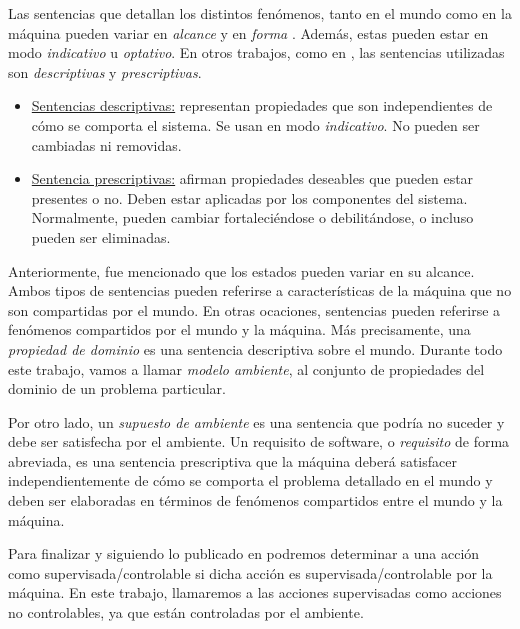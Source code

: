 Las sentencias que detallan los distintos fenómenos, tanto en el mundo como en la máquina pueden variar en
\emph{alcance} y en \emph{forma} \cite{Parnas95functionaldocuments,Jackson:1995:SRA:210207}. Además, estas pueden estar en modo \emph{indicativo} u \emph{optativo}. En
otros trabajos, como en \cite{van2009requirements}, las sentencias utilizadas son \emph{descriptivas} y \emph{prescriptivas}.

\begin{itemize}
    \item \underline{Sentencias descriptivas:} representan propiedades que son independientes de cómo se comporta el
    sistema. Se usan en modo \emph{indicativo}. No pueden ser cambiadas ni removidas.
    \item \underline{Sentencia prescriptivas:} afirman propiedades deseables que pueden estar presentes o no. Deben estar
    aplicadas por los componentes del sistema. Normalmente, pueden cambiar fortaleciéndose o debilitándose, o incluso
    pueden ser eliminadas. 
\end{itemize}

Anteriormente, fue mencionado que los estados pueden variar en su alcance. Ambos tipos de sentencias pueden referirse a
características de la máquina que no son compartidas por el mundo. En otras ocaciones, sentencias pueden referirse a
fenómenos compartidos por el mundo y la máquina. Más precisamente, una \emph{propiedad de dominio} es
una sentencia descriptiva sobre el mundo. Durante todo este trabajo, vamos a llamar \emph{modelo ambiente}, al conjunto
de propiedades del dominio de un problema particular.

Por otro lado, un \emph{supuesto de ambiente} es una sentencia que podría no suceder y debe ser satisfecha por el
ambiente. Un requisito de software, o \emph{requisito} de forma abreviada, es una sentencia prescriptiva que la máquina
deberá satisfacer independientemente de cómo se comporta el problema detallado en el mundo y deben ser elaboradas en
términos de fenómenos compartidos entre el mundo y la máquina.

Para finalizar y siguiendo lo publicado en \cite{VanLamsweerde:2001:GRE:882477.883624, 879820} podremos determinar a una
acción como supervisada/controlable si dicha acción es supervisada/controlable por la máquina. En este trabajo,
llamaremos a las acciones supervisadas como acciones no controlables, ya que están controladas por el ambiente.
